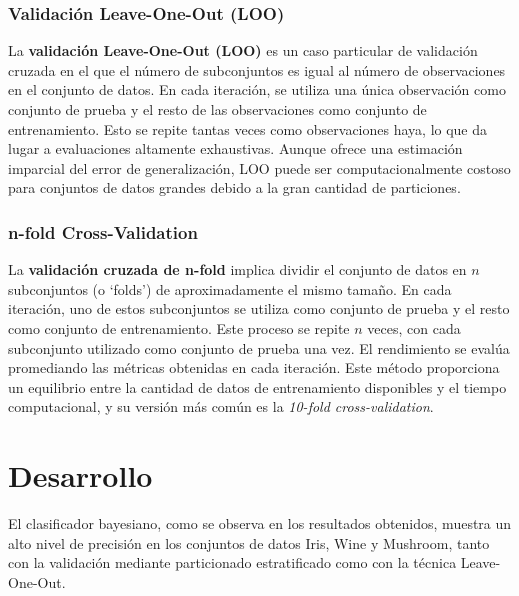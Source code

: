 \documentclass{article}
\begin{document}
\subsubsection{Validación Leave-One-Out (LOO)}

La \textbf{validación Leave-One-Out (LOO)} es un caso particular de validación cruzada en el que el número de subconjuntos es igual al número de observaciones en el conjunto de datos. En cada iteración, se utiliza una única observación como conjunto de prueba y el resto de las observaciones como conjunto de entrenamiento. Esto se repite tantas veces como observaciones haya, lo que da lugar a evaluaciones altamente exhaustivas. Aunque ofrece una estimación imparcial del error de generalización, LOO puede ser computacionalmente costoso para conjuntos de datos grandes debido a la gran cantidad de particiones.

\subsubsection{n-fold Cross-Validation}

La \textbf{validación cruzada de n-fold} implica dividir el conjunto de datos en \(n\) subconjuntos (o `folds') de aproximadamente el mismo tamaño. En cada iteración, uno de estos subconjuntos se utiliza como conjunto de prueba y el resto como conjunto de entrenamiento. Este proceso se repite \(n\) veces, con cada subconjunto utilizado como conjunto de prueba una vez. El rendimiento se evalúa promediando las métricas obtenidas en cada iteración. Este método proporciona un equilibrio entre la cantidad de datos de entrenamiento disponibles y el tiempo computacional, y su versión más común es la \textit{10-fold cross-validation}.


   
    \section{Desarrollo}
    
    El clasificador bayesiano, como se observa en los resultados obtenidos, muestra un alto nivel de precisión en los conjuntos de datos Iris, Wine y Mushroom, tanto con la validación mediante particionado estratificado como con la técnica Leave-One-Out. 
\end{document}
